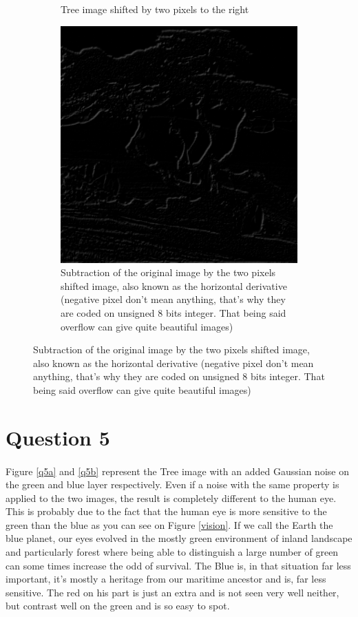 \documentclass[a4paper,11pt]{article}
\begin{document}
\begin{figure}[h!]
\begin{center}
\begin{subfigure}[t]{0.3\textwidth}
      \caption{Tree image shifted by two pixels to the right}
      \label{q4c}
    \end{subfigure}
    \begin{subfigure}[t]{0.3\textwidth}
      \centering
      \includegraphics[width=0.9\linewidth]{Images/ps0-4-d.png}
      \caption{Subtraction of the original image by the two pixels shifted image, also known as the horizontal derivative (negative pixel don't mean anything, that's why they are coded on unsigned 8 bits integer. That being said overflow can give quite beautiful images)}
      \label{q4d}
    \end{subfigure}
  \end{center}
\end{figure}

\section{Question 5}
\paragraph{}
Figure \ref{q5a} and \ref{q5b} represent the Tree image with an added Gaussian noise on the green and blue layer respectively. Even if a noise with the same property is applied to the two images, the result is completely different to the human eye. This is probably due to the fact that the human eye is more sensitive to the green than the blue as you can see on Figure \ref{vision}. If we call the Earth the blue planet, our eyes evolved in the mostly green environment of inland landscape and particularly forest where being able to distinguish a large number of green can some times increase the odd of survival. The Blue is, in that situation far less important, it's mostly a heritage from our maritime ancestor and is, far less sensitive. The red on his part is just an extra and is not seen very well neither, but contrast well on the green and is so easy to spot.
\end{document}
